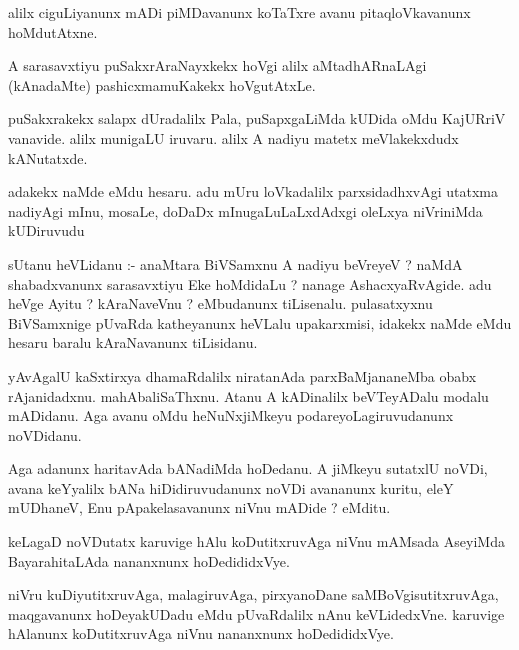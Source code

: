 \documentclass{article}
\begin{document}
\begin{mn}
alilx  ciguLiyanunx  mADi  piMDavanunx  koTaTxre  avanu  pitaqloVkavanunx  hoMdutAtxne.
\end{mn}

\begin{mn}
A sarasavxtiyu  puSakxrAraNayxkekx  hoVgi  alilx  aMtadhARnaLAgi (kAnadaMte) pashicxmamuKakekx  hoVgutAtxLe.
\end{mn}

\begin{mn}
puSakxrakekx  salapx  dUradalilx  Pala,  puSapxgaLiMda  kUDida  oMdu  KajURriV  
vanavide.  alilx  munigaLU  iruvaru.  alilx  A  nadiyu  matetx  meVlakekxdudx  kANutatxde.
\end{mn}

\begin{mn}
adakekx  naMde  eMdu  hesaru.  adu  mUru  loVkadalilx  parxsidadhxvAgi  utatxma  
nadiyAgi  mInu,  mosaLe,  doDaDx mInugaLuLaLxdAdxgi  oleLxya  niVriniMda  kUDiruvudu
\end{mn}

\begin{mn}
sUtanu  heVLidanu :- anaMtara  BiVSamxnu  A  nadiyu  beVreyeV ?  naMdA shabadxvanunx  
sarasavxtiyu  Eke  hoMdidaLu ?  nanage  AshacxyaRvAgide.  adu  heVge  Ayitu ?  
kAraNaveVnu ?  eMbudanunx  tiLisenalu.  pulasatxyxnu  BiVSamxnige  pUvaRda  katheyanunx  
heVLalu  upakarxmisi,  idakekx  naMde  eMdu  hesaru  baralu  kAraNavanunx  tiLisidanu.
\end{mn}

\begin{mn}
yAvAgalU  kaSxtirxya dhamaRdalilx  niratanAda  parxBaMjananeMba  obabx  
rAjanidadxnu.  mahAbaliSaThxnu.  Atanu  A kADinalilx  beVTeyADalu  modalu  
mADidanu.  Aga  avanu  oMdu  heNuNxjiMkeyu  podareyoLagiruvudanunx  noVDidanu.
\end{mn}

\begin{mn}
Aga  adanunx  haritavAda  bANadiMda  hoDedanu.  A  jiMkeyu  sutatxlU noVDi,  
avana  keYyalilx  bANa  hiDidiruvudanunx  noVDi  avananunx  kuritu,  eleY  
mUDhaneV,  Enu  pApakelasavanunx  niVnu  mADide ?  eMditu.
\end{mn}

\begin{mn}
keLagaD  noVDutatx  karuvige  hAlu  koDutitxruvAga  niVnu  mAMsada  AseyiMda  
BayarahitaLAda  nananxnunx  hoDedididxVye.
\end{mn}

\begin{mn}
niVru  kuDiyutitxruvAga,  malagiruvAga,  pirxyanoDane  saMBoVgisutitxruvAga,  
maqgavanunx  hoDeyakUDadu  eMdu  pUvaRdalilx  nAnu  keVLidedxVne.  karuvige  
hAlanunx  koDutitxruvAga  niVnu  nananxnunx  hoDedididxVye.
\end{mn}
\end{document}
